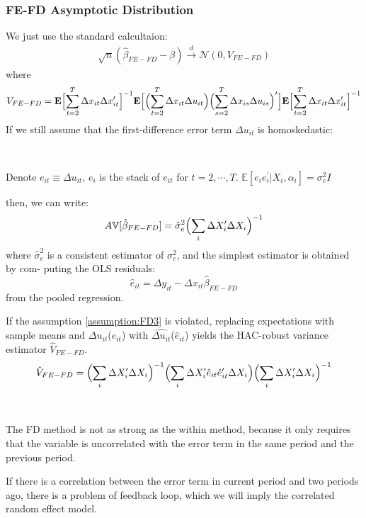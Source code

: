 \subsubsection{FE-FD Asymptotic Distribution}
We just use the standard calcultaion:
\begin{gather*}
    \sqrt{n} (\hat{\beta}_{FE-FD} - \beta) \overset{d}{\rightarrow} \mathcal{N} (0, V_{FE-FD})
\end{gather*}
where
\begin{gather*}
    V_{FE-FD} = \mathbf{E}\Bigl[ \sum_{t=2}^{T} \Delta x_{it} \Delta x_{it}^{\prime} \Bigr]^{-1} \mathbf{E}\Bigl[ \Bigl( \sum_{t=2}^{T} \Delta x_{it} \Delta u_{it} \Bigr) \Bigl( \sum_{s=2}^{T} \Delta x_{is} \Delta u_{is} \Bigr)^{\prime} \Bigr] \mathbf{E}\Bigl[ \sum_{t=2}^{T} \Delta x_{it} \Delta x_{it}^{\prime} \Bigr]^{-1} 
\end{gather*}
If we still assume that the first-difference error term $\Delta u_{it}$ is homoskedastic:
\begin{assumption}[FD homoskedasticity]\label{assumption:FD3}
    \

    Denote $e_{it} \equiv \Delta u_{it}$, $e_i$ is the stack of $e_{it}$ for $t=2, \cdots, T$. 
    $\mathbb{E}\left[e_i e_i^{\prime} | X_i, \alpha_i \right] = \sigma_e^2 I$
\end{assumption}
then, we can write:
\begin{gather*}
    A\mathbb{V}[\hat{\beta}_{FE-FD}] = \hat{\sigma}_e^2 \Bigl(\sum_{i} \Delta X_i^{\prime} \Delta X_i \Bigr)^{-1} 
\end{gather*}
where $\hat{\sigma}_e^2$ is a consistent estimator of $\sigma_e^2$, and the simplest estimator is obtained by com-
puting the OLS residuals:
\[
\hat{e}_{it} = \Delta y_{it} - \Delta x_{it} \hat{\beta}_{FE-FD}
\]
from the pooled regression.

If the assumption \ref{assumption:FD3} is violated,
replacing expectations with sample means and $\Delta u_{it}$($e_{it}$) with $\widehat{\Delta u_{it}}$($\hat{e}_{it} $) yields the HAC-robust variance estimator $\hat{V}_{FE-FD}.$
\begin{gather*}
    \hat{V}_{FE-FD} = \Bigl( \sum_{i} \Delta X_i^{\prime} \Delta X_i \Bigr)^{-1}  \Bigl( \sum_{i} \Delta X_i^{\prime} \hat{e}_{it} \hat{e}_{it}^{\prime} \Delta X_i \Bigr) \Bigl( \sum_{i} \Delta X_i^{\prime} \Delta X_i \Bigr)^{-1} 
\end{gather*}

\begin{remark}
    \

    The FD method is not as strong as the within method, because it only requires that the variable is
    uncorrelated with the error term in the same period and the previous period.

    If there is a correlation between the error term in current period and two periods ago, there is a problem of feedback loop,
    which we will imply the correlated random effect model.
\end{remark}
